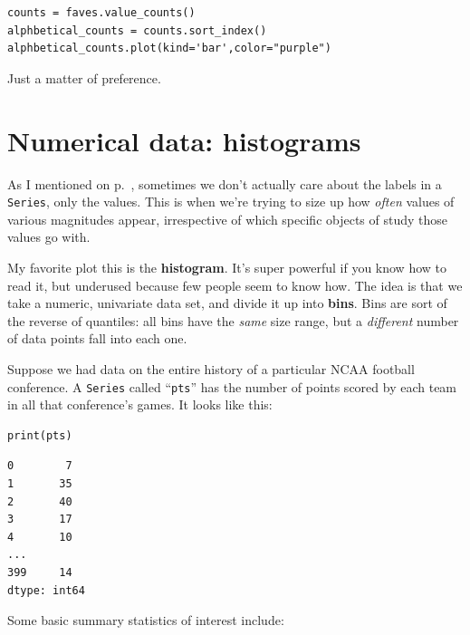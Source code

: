 \begin{Verbatim}[fontsize=\small,samepage=true,frame=single,framesep=3mm]
counts = faves.value_counts()
alphbetical_counts = counts.sort_index()
alphbetical_counts.plot(kind='bar',color="purple")
\end{Verbatim}

Just a matter of preference.

\section{Numerical data: histograms}


As I mentioned on p.~\pageref{twoWaysToPlotUnivariateData}, sometimes we don't
actually care about the labels in a \texttt{Series}, only the values. This is
when we're trying to size up how \textit{often} values of various magnitudes
appear, irrespective of which specific objects of study those values go with.


My favorite plot this is the \textbf{histogram}. It's super powerful if you
know how to read it, but underused because few people seem to know how. The
idea is that we take a numeric, univariate data set, and divide it up into
\textbf{bins}. Bins are sort of the reverse of quantiles: all bins have the
\textit{same} size range, but a \textit{different} number of data points fall
into each one.


Suppose we had data on the entire history of a particular NCAA football
conference. A \texttt{Series} called ``\texttt{pts}'' has the number of points
scored by each team in all that conference's games. It looks like this:

\begin{Verbatim}[fontsize=\small,samepage=true,frame=single,framesep=3mm]
print(pts)
\end{Verbatim}
\vspace{-.2in}

\begin{Verbatim}[fontsize=\small,samepage=true,frame=leftline,framesep=5mm,framerule=1mm]
0        7
1       35
2       40
3       17
4       10
...
399     14
dtype: int64
\end{Verbatim}

Some basic summary statistics of interest include:

